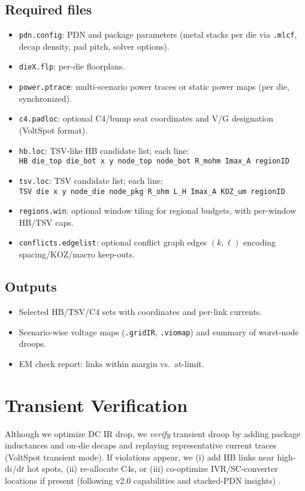 \documentclass[conference]{IEEEtran}
\begin{document}
\subsection{Required files}
\begin{itemize}[leftmargin=*,nosep]
  \item \texttt{pdn.config}: PDN and package parameters (metal stacks per die via \texttt{.mlcf}, decap density, pad pitch, solver options).
  \item \texttt{dieX.flp}: per-die floorplans.
  \item \texttt{power.ptrace}: multi-scenario power traces or static power maps (per die, synchronized).
  \item \texttt{c4.padloc}: optional C4/bump seat coordinates and V/G designation (VoltSpot format).
  \item \texttt{hb.loc}: TSV-like HB candidate list; each line:\\
  \texttt{HB  die\_top die\_bot  x y  node\_top node\_bot  R\_mohm  Imax\_A  regionID}
  \item \texttt{tsv.loc}: TSV candidate list; each line:\\
  \texttt{TSV die  x y  node\_die node\_pkg  R\_ohm  L\_H  Imax\_A  KOZ\_um  regionID}
  \item \texttt{regions.win}: optional window tiling for regional budgets, with per-window HB/TSV caps.
  \item \texttt{conflicts.edgelist}: optional conflict graph edges $(k,\ell)$ encoding spacing/KOZ/macro keep-outs.
\end{itemize}

\subsection{Outputs}
\begin{itemize}[leftmargin=*,nosep]
  \item Selected HB/TSV/C4 sets with coordinates and per-link currents.
  \item Scenario-wise voltage maps (\texttt{.gridIR}, \texttt{.viomap}) and summary of worst-node droops.
  \item EM check report: links within margin vs.\ at-limit.
\end{itemize}

\section{Transient Verification}\label{sec:transient}
Although we optimize DC IR drop, we \emph{verify} transient droop by adding package inductances and on-die decaps and replaying representative current traces (VoltSpot transient mode). If violations appear, we (i) add HB links near high-$\mathrm{d}i/\mathrm{d}t$ hot spots, (ii) re-allocate C4s, or (iii) co-optimize IVR/SC-converter locations if present (following v2.0 capabilities and stacked-PDN insights) \cite{VoltSpotHOWTO,ZhangISLPED2015}.
\end{document}
